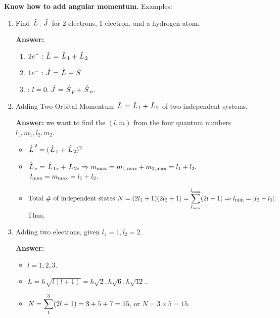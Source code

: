 \documentclass{school-22.101-notes}
\begin{document}
\textbf{Know how to add angular momentum.} 
Examples:
\begin{enumerate}
\item Find $\left. \hat{L} \right., \left. \hat{J} \right.$ for 2 electrons, 1 electron, and a hydrogen atom. 

\textbf{Answer:} 
\begin{enumerate}
\item $2e^-: \left. \hat{L} \right. = \left. \hat{L} \right._1 + \left. \hat{L} \right._2 $ 
\item $1e^-: \left. \hat{J} \right. = \left. \hat{L} \right. + \left. \hat{S} \right.$
\item {}: $l =0. \left. \hat{J} \right. = \left. \hat{S} \right._p + \left. \hat{S} \right._n$. 
\end{enumerate}

\item Adding Two Orbital Momentum $\left. \hat{L} \right.= \left. \hat{L} \right._1 + \left. \hat{L} \right._2$ of two independent systems.

\textbf{Answer:} we want to find the $(l,m)$ from the four quantum numbers $l_1, m_1, l_2, m_2$.
\begin{itemize}
\item $\left. \hat{L} \right.^2 = (\left. \hat{L} \right._1 + \left. \hat{L} \right._2)^2 $
\item $ \left. \hat{L} \right._z = \left. \hat{L} \right._{1z} + \left. \hat{L} \right._{2z} \Rightarrow m_{\mathrm{max}} = m_{\mathrm{1,max}} + m_{\mathrm{2,max}} = l_1 + l_2.$
$\mbox{ } l_{\mathrm{max}} = m_{\mathrm{max}} = l_1 + l_2.$
\item $ \mbox{Total \# of independent states } N = (2 l_1 + 1) (2l_2 + 1) = \displaystyle\sum_{l_{\mathrm{min}}}^{l_{\mathrm{max}}} (2l+1) \Rightarrow l_{\mathrm{min}} = |l_2 - l_1 |.$ Thus,
\end{itemize}


\item Adding two electrons, given $l_1 = 1, l_2 = 2$. 

\textbf{Answer:}
\begin{itemize}
\item $l = 1,2,3$.
\item $L = \hbar \sqrt{l (l+1)} = \hbar \sqrt{2}, \hbar \sqrt{6}, \hbar \sqrt{12}.$.
\item $N = \displaystyle\sum_1^3 (2l+1) = 3 + 5 + 7 = 15$, or $N = 3 \times 5 = 15$. 
\end{itemize}
\end{enumerate}
\end{document}
